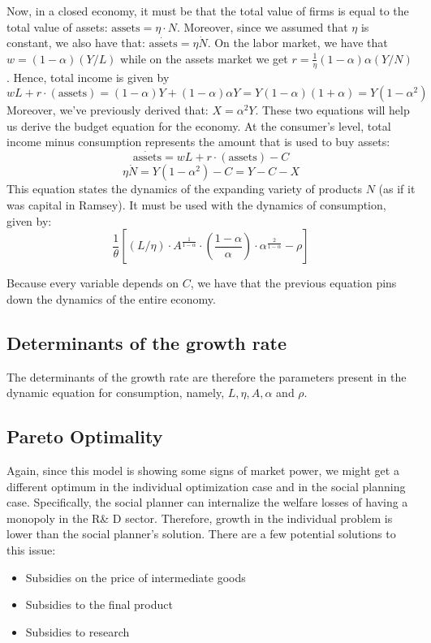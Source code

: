 \documentclass[12pt]{report}
\begin{document}
Now, in a closed economy, it must be that the total value of firms is equal to the total value of assets: $\text{assets} = \eta\cdot N$. Moreover, since we assumed that $\eta$ is constant, we also have that: $\dot{\text{assets}} = \eta \dot N $. On the labor market, we have that $w = (1-\alpha)(Y/L)$ while on the assets market we get $r = \frac{1}{\eta} (1-\alpha)\alpha (Y/N) $. Hence, total income is given by $$wL + r\cdot(\text{assets}) = (1-\alpha)Y + (1-\alpha)\alpha Y = Y(1-\alpha)(1+\alpha) = Y(1 - \alpha^2) $$ Moreover, we've previously derived that: $X = \alpha^2 Y$. These two equations  will help us derive the budget equation for the economy. At the consumer's level, total income minus consumption represents the amount that is used to buy assets: $$\dot{\text{assets}} = wL + r\cdot(\text{assets}) - C $$ $$ \eta \dot N = Y(1 - \alpha^2) - C = Y - C - X $$ This equation states the dynamics of the expanding variety of products $N$ (as if it was capital in Ramsey). It must be used with the dynamics of consumption, given by: $$ \frac{1}{\theta} \left[ (L/\eta)\cdot A^{\frac{1}{1-\alpha}} \cdot \left(\frac{1-\alpha}{\alpha}\right)\cdot\alpha^{\frac{2}{1-\alpha}} - \rho\right] $$

Because every variable depends on $C$, we have that the previous equation pins down the dynamics of the entire economy.

\subsection{Determinants of the growth rate}

The determinants of the growth rate are therefore the parameters present in the dynamic equation for consumption, namely, $L, \eta, A, \alpha$ and $\rho$.

\subsection{Pareto Optimality}

Again, since this model is showing some signs of market power, we might get a different optimum in the individual optimization case and in the social planning case. Specifically, the social planner can internalize the welfare losses of having a monopoly in the R\& D sector. Therefore, growth in the individual problem is lower than the social planner's solution. There are a few potential solutions to this issue:\begin{itemize}
\item Subsidies on the price of intermediate goods
\item Subsidies to the final product
\item Subsidies to research
\end{itemize}
\end{document}

